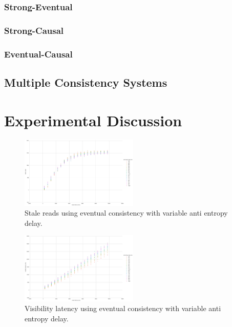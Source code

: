 \documentclass[letterpaper,twocolumn,10pt]{article}
\begin{document}
\subsubsection{Strong-Eventual}

\subsubsection{Strong-Causal}

\subsubsection{Eventual-Causal}

\subsection{Multiple Consistency Systems}

\section{Experimental Discussion}

\begin{figure}[h]
    \centering
    \includegraphics[width=0.5\textwidth]{figures/ae_stale_reads}
    \caption{Stale reads using eventual consistency with variable anti entropy delay.}
\end{figure}

\begin{figure}[h]
    \centering
    \includegraphics[width=0.5\textwidth]{figures/ae_viz_latency}
    \caption{Visibility latency using eventual consistency with variable anti entropy delay.}
\end{figure}
\end{document}
